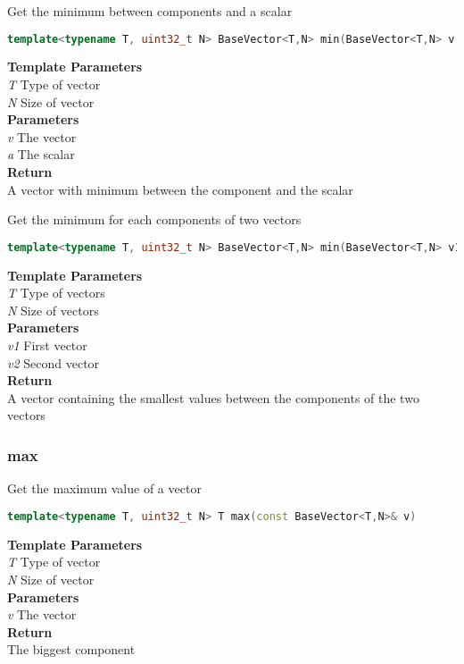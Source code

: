 \begin{mdframed}
Get the minimum between components and a scalar
\begin{lstlisting}[language=C++]
template<typename T, uint32_t N> BaseVector<T,N> min(BaseVector<T,N> v, T a) 
\end{lstlisting}
\textbf{Template Parameters} \\ 
\textit{T} Type of vector \\ 
\textit{N} Size of vector \\ 
\textbf{Parameters} \\ 
\textit{v} The vector \\ 
\textit{a} The scalar \\ 
\textbf{Return} \\ 
A vector with minimum between the component and the scalar\\ 
\end{mdframed}

\begin{mdframed}
Get the minimum for each components of two vectors
\begin{lstlisting}[language=C++]
template<typename T, uint32_t N> BaseVector<T,N> min(BaseVector<T,N> v1, const BaseVector<T,N>& v2) 
\end{lstlisting}
\textbf{Template Parameters} \\ 
\textit{T} Type of vectors \\ 
\textit{N} Size of vectors \\ 
\textbf{Parameters} \\ 
\textit{v1} First vector \\ 
\textit{v2} Second vector \\ 
\textbf{Return} \\ 
A vector containing the smallest values between the components of the two vectors\\ 
\end{mdframed}

\subsubsection{max}
\begin{mdframed}
Get the maximum value of a vector
\begin{lstlisting}[language=C++]
template<typename T, uint32_t N> T max(const BaseVector<T,N>& v) 
\end{lstlisting}
\textbf{Template Parameters} \\ 
\textit{T} Type of vector \\ 
\textit{N} Size of vector \\ 
\textbf{Parameters} \\ 
\textit{v} The vector \\ 
\textbf{Return} \\ 
The biggest component\\ 
\end{mdframed}

